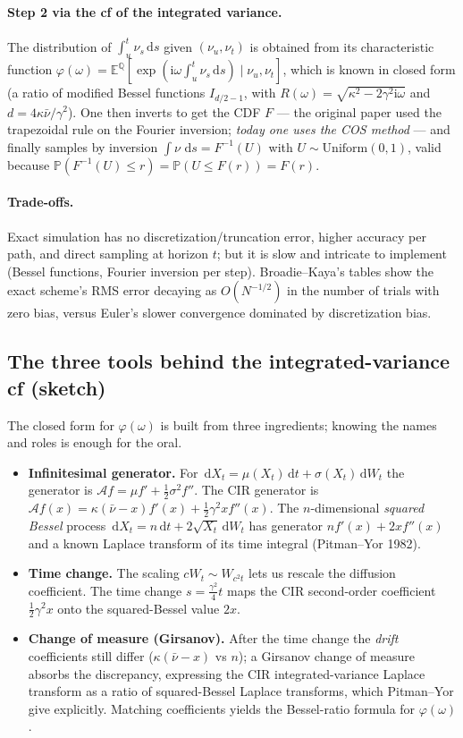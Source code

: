 \documentclass[11pt]{article}
\newcommand{\E}{\mathbb{E}}
\newcommand{\ii}{\mathrm{i}}
\newcommand{\dd}{\,\mathrm{d}}
\newcommand{\ch}{\varphi}
\begin{document}
\paragraph{Step 2 via the cf of the integrated variance.}
The distribution of $\int_u^t\nu_s\dd s$ given $(\nu_u,\nu_t)$ is obtained from its
characteristic function $\ch(\omega)=\E^{\mathbb Q}[\exp(\ii\omega\int_u^t\nu_s\dd s)\mid\nu_u,\nu_t]$,
which is known in closed form (a ratio of modified Bessel functions $I_{d/2-1}$, with
$R(\omega)=\sqrt{\kappa^2-2\gamma^2\ii\omega}$ and $d=4\kappa\bar\nu/\gamma^2$). One then
inverts to get the CDF $F$ --- the original paper used the trapezoidal rule on the Fourier
inversion; \emph{today one uses the COS method} --- and finally samples by inversion
$\int\nu\,\dd s = F^{-1}(U)$ with $U\sim\mathrm{Uniform}(0,1)$, valid because
$\mathbb P(F^{-1}(U)\le r)=\mathbb P(U\le F(r))=F(r)$.

\paragraph{Trade-offs.} Exact simulation has no discretization/truncation error, higher
accuracy per path, and direct sampling at horizon $t$; but it is slow and intricate to
implement (Bessel functions, Fourier inversion per step). Broadie--Kaya's tables show the
exact scheme's RMS error decaying as $O(N^{-1/2})$ in the number of trials with zero bias,
versus Euler's slower convergence dominated by discretization bias.

\subsection{The three tools behind the integrated-variance cf (sketch)}

The closed form for $\ch(\omega)$ is built from three ingredients; knowing the names and
roles is enough for the oral.
\begin{itemize}[noitemsep]
\item \textbf{Infinitesimal generator.} For $\dd X_t=\mu(X_t)\dd t+\sigma(X_t)\dd W_t$ the
generator is $\mathcal A f = \mu f' + \tfrac12\sigma^2 f''$. The CIR generator is
$\mathcal A f(x)=\kappa(\bar\nu-x)f'(x)+\tfrac12\gamma^2 x f''(x)$. The $n$-dimensional
\emph{squared Bessel} process $\dd X_t = n\dd t + 2\sqrt{X_t}\dd W_t$ has generator
$nf'(x)+2xf''(x)$ and a known Laplace transform of its time integral (Pitman--Yor 1982).
\item \textbf{Time change.} The scaling $cW_t\sim W_{c^2 t}$ lets us rescale the diffusion
coefficient. The time change $s=\tfrac{\gamma^2}{4}t$ maps the CIR second-order coefficient
$\tfrac12\gamma^2 x$ onto the squared-Bessel value $2x$.
\item \textbf{Change of measure (Girsanov).} After the time change the \emph{drift}
coefficients still differ ($\kappa(\bar\nu-x)$ vs $n$); a Girsanov change of measure absorbs
the discrepancy, expressing the CIR integrated-variance Laplace transform as a ratio of
squared-Bessel Laplace transforms, which Pitman--Yor give explicitly. Matching coefficients
yields the Bessel-ratio formula for $\ch(\omega)$.
\end{itemize}
\end{document}
